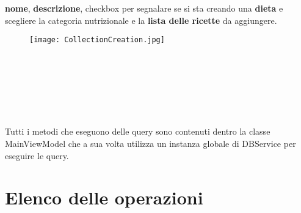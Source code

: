 ﻿\documentclass[a4paper,12pt]{report}
\begin{document}
\textbf{nome}, \textbf{descrizione}, checkbox per segnalare se si sta creando una \textbf{dieta} e scegliere la categoria nutrizionale e la \textbf{lista delle ricette} da aggiungere.
\begin{figure}[h!]
    \centering
    \texttt{[image: CollectionCreation.jpg]}
\end{figure}
\\\\\\\\\\\\Tutti i metodi che eseguono delle query sono contenuti dentro la classe MainViewModel che a sua volta utilizza un instanza globale di DBService per eseguire le query.
\section{Elenco delle operazioni}
\end{document}
